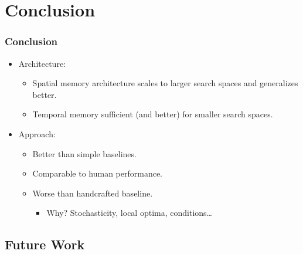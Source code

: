 \section{Conclusion}

\begin{frame}
    \frametitle{Conclusion}

    \begin{itemize}
        \item Architecture:
        \begin{itemize}
            \item Spatial memory architecture scales to larger search spaces and generalizes better.
            \item Temporal memory sufficient (and better) for smaller search spaces.
        \end{itemize}
        \item Approach:
        \begin{itemize}
            \item Better than simple baselines.
            \item Comparable to human performance.
            \item Worse than handcrafted baseline.
            \begin{itemize}
                \item Why? Stochasticity, local optima, conditions\dots
            \end{itemize}
        \end{itemize}
    \end{itemize}
\end{frame}

\subsection{Future Work}

